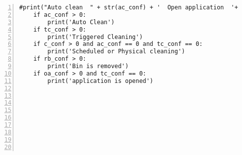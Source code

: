 \begin{lstlisting}[numbers=left]
    #print("Auto clean  " + str(ac_conf) + '  Open application  '+ str(oa_conf) + '   Cleaning  ' + str(c_conf) + '  triggered  ' + str(tc_conf) + '  Pysical  ' + str(pc_conf))
    if ac_conf > 0:
        print('Auto Clean')
    if tc_conf > 0:
        print('Triggered Cleaning')
    if c_conf > 0 and ac_conf == 0 and tc_conf == 0:
        print('Scheduled or Physical cleaning')
    if rb_conf > 0:
        print('Bin is removed')
    if oa_conf > 0 and tc_conf == 0:
        print('application is opened')

    
    


    




\end{lstlisting}